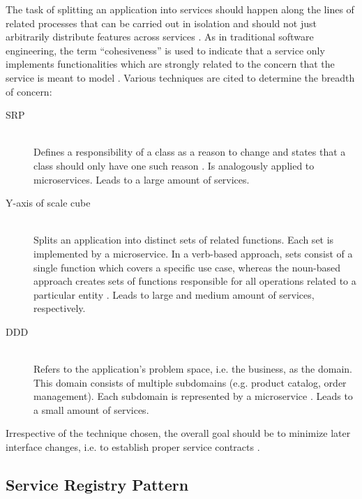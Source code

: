 The task of splitting an application into services should happen along the lines of related processes that can be carried out in isolation and should not just arbitrarily distribute features across services \cite[p.~61]{taibi2018definition}. As in traditional software engineering, the term \enquote{cohesiveness} is used to indicate that a service only implements functionalities which are strongly related to the concern that the service is meant to model \cite[p.~2]{dragoni2017microservices}. Various techniques are cited to determine the breadth of concern:

\begin{description}
  \item[\acl{SRP}]
  \hfill \\
  Defines a responsibility of a class as a reason to change and states that a class should only have one such reason \cite[p.~36]{messina2016simplified} \cite[p.~116]{thones2015microservices}. Is analogously applied to microservices. Leads to a large amount of services.

  \item[Y-axis of \gls{scale cube}]
  \hfill \\
  Splits an application into distinct sets of related functions. Each set is implemented by a microservice. In a verb-based approach, sets consist of a single function which covers a specific use case, whereas the noun-based approach creates sets of functions responsible for all operations related to a particular entity \cite[p.~36]{messina2016simplified}. Leads to large and medium amount of services, respectively.

  \item[\acl{DDD}]
  \hfill \\
  Refers to the application's problem space, i.e. the business, as the domain. This domain consists of multiple subdomains (e.g. product catalog, order management). Each subdomain is represented by a microservice \cite[p.~3]{balalaie2016microservices}. Leads to a small amount of services.
\end{description}

Irrespective of the technique chosen, the overall goal should be to minimize later interface changes, i.e. to establish proper service contracts \cite[p.~26]{dmitry2014micro}.


\subsection{Service Registry Pattern}
\label{sec:service-registry-pattern}


